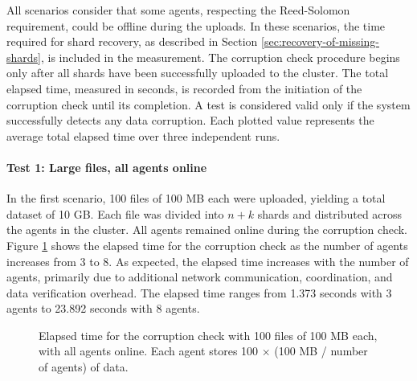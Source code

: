 All scenarios consider that some agents, respecting the Reed-Solomon requirement, could be offline during the uploads. In these scenarios, the time required for shard recovery, as described in Section \ref{sec:recovery-of-missing-shards}, is included in the measurement. The corruption check procedure begins only after all shards have been successfully uploaded to the cluster. The total elapsed time, measured in seconds, is recorded from the initiation of the corruption check until its completion. A test is considered valid only if the system successfully detects any data corruption. Each plotted value represents the average total elapsed time over three independent runs.

\paragraph{Test 1: Large files, all agents online}

In the first scenario, 100 files of 100 MB each were uploaded, yielding a total
dataset of 10 GB. Each file was divided into $n+k$ shards and distributed across
the agents in the cluster. All agents remained online during the corruption
check. Figure \ref{fig:test-1} shows the elapsed time for the corruption check
as the number of agents increases from 3 to 8. 
As expected, the elapsed time increases with the number of agents, primarily due
to additional network communication, coordination, and data verification
overhead. The elapsed time ranges from 1.373 seconds with 3 agents to 23.892 seconds with 8 agents.

\begin{figure}[!ht]
\centering
{}
\caption{Elapsed time for the corruption check with 100 files of 100 MB each,
    with all agents online. Each agent stores 100 $\times$ (100 MB / number of agents) of data.}
\label{fig:test-1}
\end{figure}


